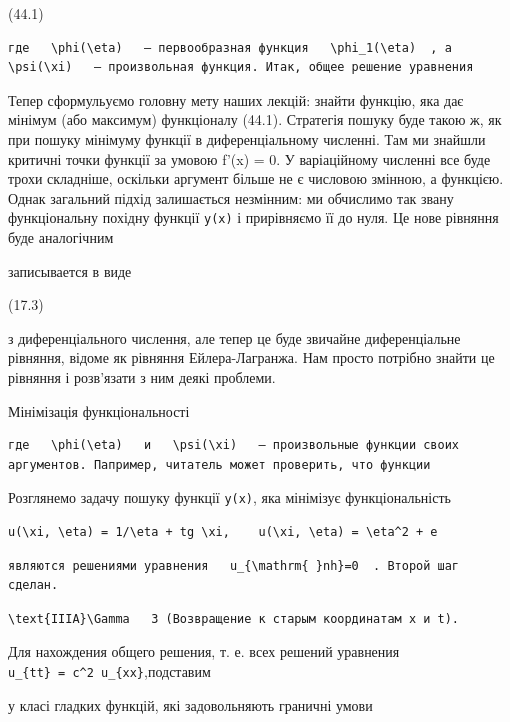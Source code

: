 \documentclass[
  ukrainian,
]{article}
\begin{document}
(44.1)

\begin{verbatim}
где   \phi(\eta)   — первообразная функция   \phi_1(\eta)  , а   \psi(\xi)   — произвольная функция. Итак, общее решение уравнения
\end{verbatim}

Тепер сформульуємо головну мету наших лекцій: знайти функцію, яка дає
мінімум (або максимум) функціоналу (44.1). Стратегія пошуку буде такою
ж, як при пошуку мінімуму функції в диференціальному численні. Там ми
знайшли критичні точки функції за умовою f'(x) = 0. У варіаційному
численні все буде трохи складніше, оскільки аргумент більше не є
числовою змінною, а функцією. Однак загальний підхід залишається
незмінним: ми обчислимо так звану функціональну похідну функції
\texttt{y(x)} і прирівняємо її до нуля. Це нове рівняння буде
аналогічним

записывается в виде

(17.3)

з диференціального числення, але тепер це буде звичайне диференціальне
рівняння, відоме як рівняння Ейлера-Лагранжа. Нам просто потрібно знайти
це рівняння і розв'язати з ним деякі проблеми.

Мінімізація функціональності

\begin{verbatim}
где   \phi(\eta)   и   \psi(\xi)   — произвольные функции своих аргументов. Папример, читатель может проверить, что функции
\end{verbatim}

Розглянемо задачу пошуку функції \texttt{y(x)}, яка мінімізує
функціональність

\begin{verbatim}
u(\xi, \eta) = 1/\eta + tg \xi,    u(\xi, \eta) = \eta^2 + e
\end{verbatim}

\begin{verbatim}
являются решениями уравнения   u_{\mathrm{ }nh}=0  . Второй шаг сделан.
\end{verbatim}

\begin{verbatim}
\text{IIIA}\Gamma   3 (Возвращение к старым координатам x и t).
\end{verbatim}

Для нахождения общего решения, т. е. всех решений уравнения
\texttt{u\_\{tt\}\ =\ c\^{}2\ u\_\{xx\}},подставим

у класі гладких функцій, які задовольняють граничні умови
\end{document}
